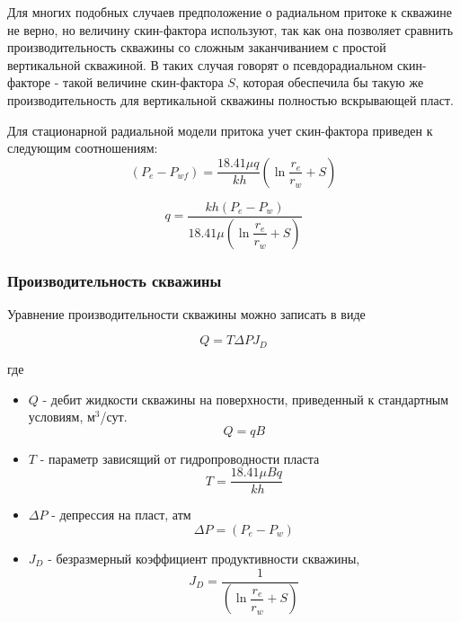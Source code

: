 Для многих подобных случаев предположение о радиальном притоке к скважине не верно, но величину скин-фактора используют, так как она позволяет сравнить производительность скважины со сложным заканчиванием с простой вертикальной скважиной. В таких случая говорят о псевдорадиальном скин-факторе - такой величине скин-фактора $S$, которая обеспечила бы такую же производительность для вертикальной скважины полностью вскрывающей пласт. 

Для стационарной радиальной модели притока учет скин-фактора приведен к следующим соотношениям:
\begin{equation} \label{eq:dupui_skin_1}
(P_e - P_{wf}) = \frac{18.41\mu q }{\ k h}(\ln\frac{r_e}{r_w}+S) 
\end{equation}


\begin{equation} \label{eq:dupui_skin_2}
q=\frac{kh\left(P_e-P_w\right)}{ 18.41 \mu\left(\ln{\dfrac{r_e}{r_w}} + S\right)}
\end{equation}

\subsubsection{Производительность скважины}

Уравнение производительности скважины можно записать в виде

\begin{equation} \label{eq:well_productivity}
Q = T \Delta P J_D
\end{equation}

где
\begin{itemize}
	\item $Q$ - дебит жидкости скважины на поверхности, приведенный к стандартным условиям, м$^3$/сут. $$Q = qB$$

	\item $T$ - параметр зависящий от гидропроводности пласта 
	\begin{equation} \label{eq:T}
		T=\dfrac{18.41\mu B q }{\ k h}
	\end{equation}
	
	\item $\Delta P$ - депрессия на пласт, атм 
	\begin{equation} \label{eq:dP}
		\Delta P = \left(P_e-P_w\right)
	\end{equation}
	
	
	\item $J_D$ - безразмерный коэффициент продуктивности скважины, 
	\begin{equation} \label{eq:JD}
		J_D = \dfrac{1}{ \left(\ln{\dfrac{r_e}{r_w}} + S\right)}
	\end{equation}
	

\end{itemize}

